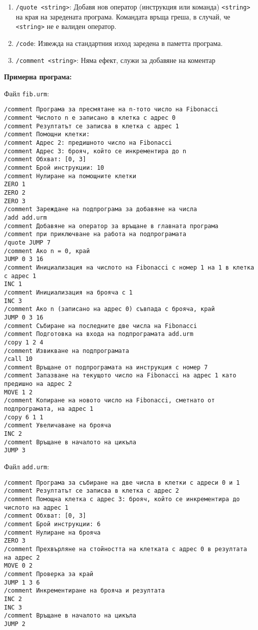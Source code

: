 \documentclass[12pt,a4paper]{article}
\newcommand{\code}[1]{\texttt{#1}}
\begin{document}
{\begin{enumerate}
    Операторите на $P$ да се добавят последователно към края на заредената в паметта програма.
    \item \code{/quote <string>}: Добавя нов оператор (инструкция или команда) \code{<string>} на края на заредената програма. Командата връща греша, в случай, че \code{<string>} не е валиден оператор.
    \item \code{/code}: Извежда на стандартния изход заредена в паметта програма.
    \item \code{/comment <string>}: Няма ефект, служи за добавяне на коментар
    \end{enumerate}

    \textbf{Примерна програма:}

Файл \code{fib.urm}:
\begin{verbatim}
/comment Програма за пресмятане на n-тото число на Fibonacci
/comment Числото n е записано в клетка с адрес 0
/comment Резултатът се записва в клетка с адрес 1
/comment Помощни клетки:
/comment Адрес 2: предишното число на Fibonacci
/comment Адрес 3: брояч, който се инкрементира до n
/comment Обхват: [0, 3]
/comment Брой инструкции: 10
/comment Нулиране на помощните клетки
ZERO 1
ZERO 2
ZERO 3
/comment Зареждане на подпрограма за добавяне на числа
/add add.urm
/comment Добавяне на оператор за връщане в главната програма
/comment при приключване на работа на подпрограмата
/quote JUMP 7
/comment Ако n = 0, край
JUMP 0 3 16
/comment Инициализация на числото на Fibonacci с номер 1 на 1 в клетка с адрес 1
INC 1
/comment Инициализация на брояча с 1
INC 3
/comment Ако n (записано на адрес 0) съвпада с брояча, край
JUMP 0 3 16
/comment Събиране на последните две числа на Fibonacci
/comment Подготовка на входа на подпрограмата add.urm
/copy 1 2 4
/comment Извикване на подпрограмата
/call 10
/comment Връщане от подпрограмата на инструкция с номер 7
/comment Запазване на текущото число на Fibonacci на адрес 1 като предишно на адрес 2
MOVE 1 2
/comment Копиране на новото число на Fibonacci, сметнато от подпрограмата, на адрес 1
/copy 6 1 1
/comment Увеличаване на брояча
INC 2
/comment Връщане в началото на цикъла
JUMP 3
\end{verbatim}

Файл \code{add.urm}:
\begin{verbatim}
/comment Програма за събиране на две числа в клетки с адреси 0 и 1
/comment Резултатът се записва в клетка с адрес 2
/comment Помощна клетка с адрес 3: брояч, който се инкрементира до числото на адрес 1
/comment Обхват: [0, 3]
/comment Брой инструкции: 6
/comment Нулиране на брояча
ZERO 3
/comment Прехвърляне на стойността на клетката с адрес 0 в резултата на адрес 2
MOVE 0 2
/comment Проверка за край
JUMP 1 3 6
/comment Инкрементиране на брояча и резултата
INC 2
INC 3
/comment Връщане в началото на цикъла
JUMP 2
\end{verbatim}

}
\end{document}
